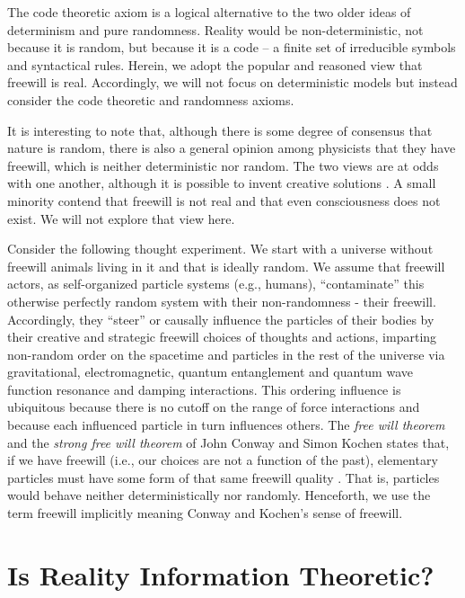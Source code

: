 \documentclass[submission,copyright,creativecommons]{eptcs}
\begin{document}
The code theoretic axiom is a logical alternative to the two older ideas of determinism and pure randomness. Reality would be non-deterministic, not because it is random, but because it is a code -- a finite set of irreducible symbols and syntactical rules. Herein, we adopt the popular and reasoned view that freewill is real. Accordingly, we will not focus on deterministic models but instead consider the code theoretic and randomness axioms.

It is interesting to note that, although there is some degree of consensus that nature is random, there is also a general opinion among physicists that they have freewill, which is neither deterministic nor random. The two views are at odds with one another, although it is possible to invent creative solutions \cite{mckenna2004compatibilism}. A small minority contend that freewill is not real and that even consciousness does not exist. We will not explore that view here.

Consider the following thought experiment. We start with a universe without freewill animals living in it and that is ideally random. We assume that freewill actors, as self-organized particle systems (e.g., humans), “contaminate” this otherwise perfectly random system with their non-randomness - their freewill. Accordingly, they “steer” or causally influence the particles of their bodies by their creative and strategic freewill choices of thoughts and actions, imparting non-random order on the spacetime and particles in the rest of the universe via gravitational, electromagnetic, quantum entanglement and quantum wave function resonance and damping interactions. This ordering influence is ubiquitous because there is no cutoff on the range of force interactions and because each influenced particle in turn influences others. The \textit{free will theorem} and the \textit{strong free will theorem} of John Conway and Simon Kochen states that, if we have freewill (i.e., our choices are not a function of the past), elementary particles must have some form of that same freewill quality \cite{conway2006free,conway2009strong}. That is, particles would behave neither deterministically nor randomly. Henceforth, we use the term freewill implicitly meaning Conway and Kochen's sense of freewill.

\section{Is Reality Information Theoretic?}
\label{sec:1}
\end{document}
